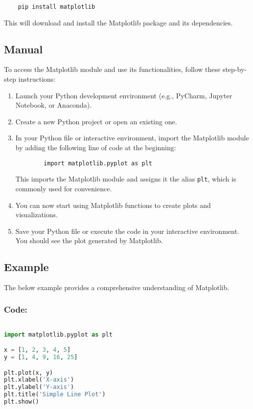 \begin{verbatim}
	pip install matplotlib
\end{verbatim}

This will download and install the Matplotlib package and its dependencies.


\subsection{Manual}

To access the Matplotlib module and use its functionalities, follow these step-by-step instructions:

\begin{enumerate}
	\item Launch your Python development environment (e.g., PyCharm, Jupyter Notebook, or Anaconda).
	\item Create a new Python project or open an existing one.
	\item In your Python file or interactive environment, import the Matplotlib module by adding the following line of code at the beginning:
	
	\begin{verbatim}
		import matplotlib.pyplot as plt
	\end{verbatim}
	
	This imports the Matplotlib module and assigns it the alias \texttt{plt}, which is commonly used for convenience.
	
	\item You can now start using Matplotlib functions to create plots and visualizations.
	\item Save your Python file or execute the code in your interactive environment. You should see the plot generated by Matplotlib.
\end{enumerate}


\subsection{Example}

The below example provides a comprehensive understanding of Matplotlib.

\subsubsection{Code:}

\begin{lstlisting}[language=Python]

import matplotlib.pyplot as plt

x = [1, 2, 3, 4, 5]
y = [1, 4, 9, 16, 25]

plt.plot(x, y)
plt.xlabel('X-axis')
plt.ylabel('Y-axis')
plt.title('Simple Line Plot')
plt.show()

\end{lstlisting}


